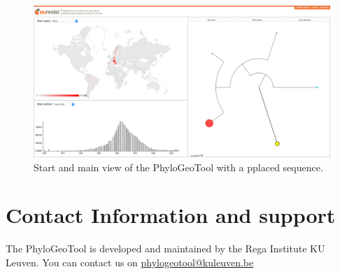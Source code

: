 \documentclass[a4paper, 11pt]{article} %
\begin{document}
\begin{figure}[H]
\centering
\includegraphics[scale=0.1875]{images/pplaced_sequence.png}
\vspace{-0.75cm}
\caption{Start and main view of the PhyloGeoTool with a pplaced sequence.}
\label{fig:pplacer-view}
\end{figure}






\section{Contact Information and support }

The PhyloGeoTool is developed and maintained by the Rega Institute KU Leuven.
You can contact us on \href{mailto:phylogeotool@kuleuven.be}{phylogeotool@kuleuven.be}





\end{document}
